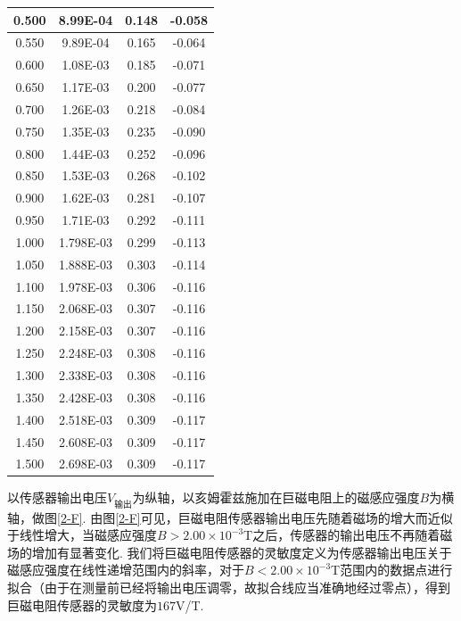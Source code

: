 \documentclass[UTF8,10pt,a4paper]{article}
\begin{document}
\begin{table}[h]
\begin{tabular}{|c|c|c|c|}
        0.500 & 8.99E-04 & 0.148 & -0.058 \\ \hline
        0.550 & 9.89E-04 & 0.165 & -0.064 \\ \hline
        0.600 & 1.08E-03 & 0.185 & -0.071 \\ \hline
        0.650 & 1.17E-03 & 0.200 & -0.077 \\ \hline
        0.700 & 1.26E-03 & 0.218 & -0.084 \\ \hline
        0.750 & 1.35E-03 & 0.235 & -0.090 \\ \hline
        0.800 & 1.44E-03 & 0.252 & -0.096 \\ \hline
        0.850 & 1.53E-03 & 0.268 & -0.102 \\ \hline
        0.900 & 1.62E-03 & 0.281 & -0.107 \\ \hline
        0.950 & 1.71E-03 & 0.292 & -0.111 \\ \hline
        1.000 & 1.798E-03 & 0.299 & -0.113 \\ \hline
        1.050 & 1.888E-03 & 0.303 & -0.114 \\ \hline
        1.100 & 1.978E-03 & 0.306 & -0.116 \\ \hline
        1.150 & 2.068E-03 & 0.307 & -0.116 \\ \hline
        1.200 & 2.158E-03 & 0.307 & -0.116 \\ \hline
        1.250 & 2.248E-03 & 0.308 & -0.116 \\ \hline
        1.300 & 2.338E-03 & 0.308 & -0.116 \\ \hline
        1.350 & 2.428E-03 & 0.308 & -0.116 \\ \hline
        1.400 & 2.518E-03 & 0.309 & -0.117 \\ \hline
        1.450 & 2.608E-03 & 0.309 & -0.117 \\ \hline
        1.500 & 2.698E-03 & 0.309 & -0.117 \\ \hline
    \end{tabular}
    \normalsize
\end{table}

以传感器输出电压$V_{\text{输出}}$为纵轴，以亥姆霍兹施加在巨磁电阻上的磁感应强度$B$为横轴，做图\ref{2-F}. 由图\ref{2-F}可见，巨磁电阻传感器输出电压先随着磁场的增大而近似于线性增大，当磁感应强度$B>2.00\times 10^{-3}$T之后，传感器的输出电压不再随着磁场的增加有显著变化. 我们将巨磁电阻传感器的灵敏度定义为传感器输出电压关于磁感应强度在线性递增范围内的斜率，对于$B<2.00\times 10^{-3}$T范围内的数据点进行拟合（由于在测量前已经将输出电压调零，故拟合线应当准确地经过零点），得到巨磁电阻传感器的灵敏度为$167$V/T.
\end{document}
